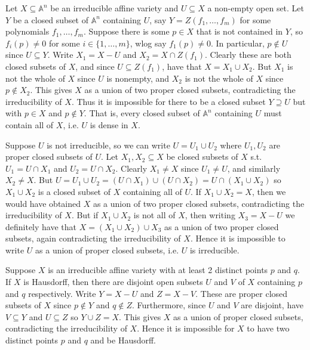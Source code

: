 \documentclass[hidelinks, 12pt]{article}
\theoremstyle{mydefstyle}
\theoremstyle{mythmstyle}
\newcounter{prop}
\begin{document}
Let $X \subseteq \mathbb{A}^n$ be an irreducible affine variety and $U \subseteq X$ a non-empty open set. Let $Y$ be a closed subset of $\mathbb{A}^n$ containing $U$, say $Y = Z(f_1, \dots, f_m)$ for some polynomials $f_1, \dots, f_m$. Suppose there is some $p \in X$ that is not contained in $Y$, so $f_i(p) \ne 0$ for some $i \in \{1, \dots, m\}$, wlog say $f_1(p) \ne 0$. In particular, $p \not\in U$ since $U \subseteq Y$. Write $X_1 = X - U$ and $X_2 = X \cap Z(f_1)$. Clearly these are both closed subsets of $X$, and since $U \subseteq Z(f_1)$, have that $X = X_1 \cup X_2$. But $X_1$ is not the whole of $X$ since $U$ is nonempty, and $X_2$ is not the whole of $X$ since $p \not \in X_2$. This gives $X$ as a union of two proper closed subsets, contradicting the irreducibility of $X$. Thus it is impossible for there to be a closed subset $Y \supseteq U$ but with $p \in X$ and $p \not\in Y$. That is, every closed subset of $\mathbb{A}^n$ containing $U$ must contain all of $X$, i.e. $U$ is dense in $X$. 

Suppose $U$ is not irreducible, so we can write $U = U_1 \cup U_2$ where $U_1, U_2$ are proper closed subsets of $U$. Let $X_1, X_2 \subseteq X$ be closed subsets of $X$ s.t. $U_1 = U \cap X_1$ and $U_2 = U \cap X_2$. Clearly $X_1 \ne X$ since $U_1 \ne U$, and similarly $X_2 \ne X$. But $U = U_1 \cup U_2 = (U \cap X_1) \cup (U \cap X_2) = U \cap (X_1 \cup X_2)$ so $X_1 \cup X_2$ is a closed subset of $X$ containing all of $U$. If $X_1 \cup X_2 = X$, then we would have obtained $X$ as a union of two proper closed subsets, contradicting the irreducibility of $X$. But if $X_1 \cup X_2$ is not all of $X$, then writing $X_3 = X - U$ we definitely have that $X = (X_1 \cup X_2) \cup X_3$ as a union of two proper closed subsets, again contradicting the irreducibility of $X$. Hence it is impossible to write $U$ as a union of proper closed subsets, i.e. $U$ is irreducible.

Suppose $X$ is an irreducible affine variety with at least 2 distinct points $p$ and $q$. If $X$ is Hausdorff, then there are disjoint open subsets $U$ and $V$ of $X$ containing $p$ and $q$ respectively. Write $Y = X - U$ and $Z = X - V$. These are proper closed subsets of $X$ since $p \not\in Y$ and $q \not\in Z$. Furthermore, since $U$ and $V$ are disjoint, have $V \subseteq Y$ and $U \subseteq Z$ so $Y \cup Z = X$. This gives $X$ as a union of proper closed subsets, contradicting the irreducibility of $X$. Hence it is impossible for $X$ to have two distinct points $p$ and $q$ and be Hausdorff. 
\end{document}
